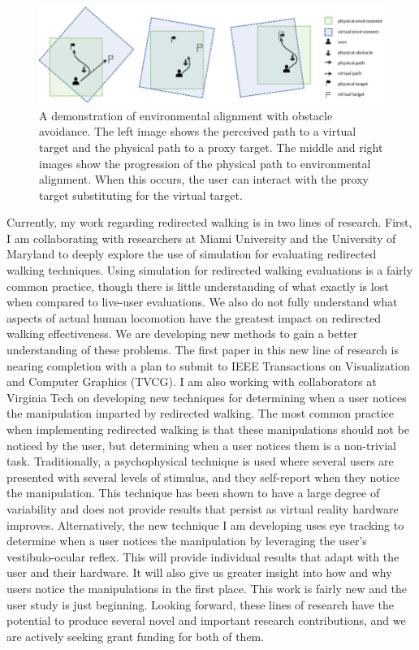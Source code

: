 \begin{figure}[!htb]
  \centering
  \includegraphics[width=.8\textwidth]{figures/alignment.png}
	\caption[]{A demonstration of environmental alignment with obstacle avoidance. 
	The left image shows the perceived path to a virtual target and the physical path to a proxy target.
	The middle and right images show the progression of the physical path to environmental alignment.
	When this occurs, the user can interact with the proxy target substituting for the virtual target.}
  \label{fig:alignment}
\end{figure}

Currently, my work regarding redirected walking is in two lines of research. First, I am collaborating with researchers at Miami University and the University of Maryland to deeply explore the use of simulation for evaluating redirected walking techniques. Using simulation for redirected walking evaluations is a fairly common practice, though there is little understanding of what exactly is lost when compared to live-user evaluations. We also do not fully understand what aspects of actual human locomotion have the greatest impact on redirected walking effectiveness. We are developing new methods to gain a better understanding of these problems. The first paper in this new line of research is nearing completion with a plan to submit to IEEE Transactions on Visualization and Computer Graphics (TVCG). I am also working with collaborators at Virginia Tech on developing new techniques for determining when a user notices the manipulation imparted by redirected walking. The most common practice when implementing redirected walking is that these manipulations should not be noticed by the user, but determining when a user notices them is a non-trivial task. Traditionally, a psychophysical technique is used where several users are presented with several levels of stimulus, and they self-report when they notice the manipulation. This technique has been shown to have a large degree of variability and does not provide results that persist as virtual reality hardware improves. Alternatively, the new technique I am developing uses eye tracking to determine when a user notices the manipulation by leveraging the user's vestibulo-ocular reflex. This will provide individual results that adapt with the user and their hardware. It will also give us greater insight into how and why users notice the manipulations in the first place. This work is fairly new and the user study is just beginning. Looking forward, these lines of research have the potential to produce several novel and important research contributions, and we are actively seeking grant funding for both of them.


